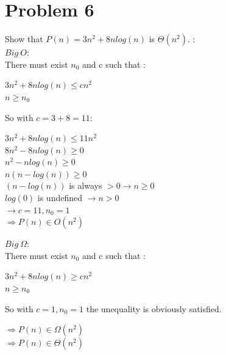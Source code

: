 \documentclass{report}
\newcommand\tab[1][1cm]{\hspace*{#1}}
\begin{document}
    \section*{\huge Problem 6}
        Show that $P(n) = 3n^2 + 8nlog(n)$  is $\Theta(n^2).$ : \\
        \tab $Big\ O:$\\
        \tab There must exist $n_0$ and c such that :
        \begin{center}
            $3n^2 + 8nlog(n) \leq cn^2$\\
            \large $n \geq n_0$
        \end{center}
        \tab So with $c = 3 + 8 = 11 : $
        \begin{center}
            $3n^2 + 8nlog(n) \leq 11n^2$\\
            $8n^2 - 8nlog(n) \geq 0$\\
            $n^2 - nlog(n) \geq 0$\\
            $n(n - log(n)) \geq 0$\\
            $(n - log(n))$ is always $> 0 \rightarrow n \geq 0$\\ 
            $log(0)$ is undefined $ \rightarrow n > 0 $\\
            \large $\rightarrow c = 11, n_0  = 1$\\
            \Large $\Rightarrow P(n) \in O(n^2)$
        \end{center}
        \tab $Big\ \Omega:$\\
        \tab There must exist $n_0$ and c such that :
        \begin{center}
            $3n^2 + 8nlog(n) \geq cn^2$\\
            \large $n \geq n_0$
        \end{center}
        \tab So with $c = 1, n_0 = 1$ the unequality is obviously satisfied.
        \begin{center}
            \Large $\Rightarrow P(n) \in \Omega(n^2)$ \\
            \huge $\Rightarrow P(n) \in \Theta(n^2)$
        \end{center}
\end{document}
